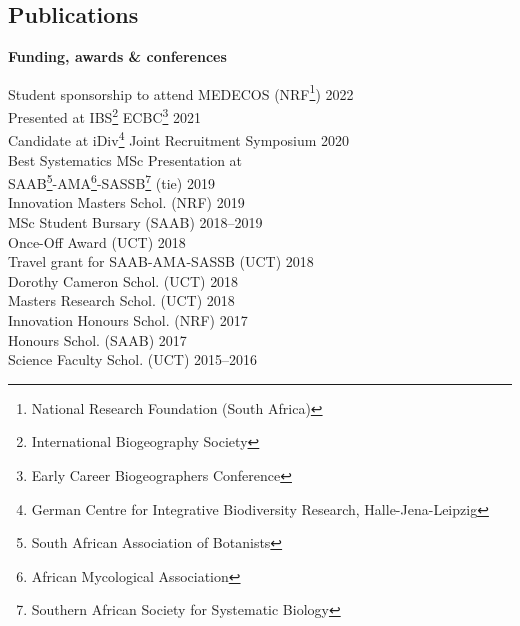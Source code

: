 \documentclass[10pt]{article}
\begin{document}


\bigskip



\subsection*{Publications} %



\hrulefill

\begin{multicols}{2}

\textbf{Funding, awards \& conferences} %

Student sponsorship to attend MEDECOS {\small
  (NRF\footnote{National Research Foundation
  (South Africa)})}                                \hfill {\small       2022} \\
Presented at IBS\footnote{International
  Biogeography Society} ECBC\footnote{Early Career
  Biogeographers Conference}                       \hfill {\small       2021} \\
Candidate at iDiv\footnote{German Centre for
  Integrative Biodiversity Research,
  Halle-Jena-Leipzig} Joint Recruitment Symposium  \hfill {\small       2020} \\
Best Systematics MSc Presentation at                                          \\
\hspace{2em} SAAB\footnote{South African
  Association of Botanists}-AMA\footnote{African
  Mycological Association}-SASSB\footnote{Southern
  African Society for Systematic Biology} (tie)    \hfill {\small       2019} \\
Innovation Masters Schol.          {\small  (NRF)} \hfill {\small       2019} \\
MSc Student Bursary                {\small (SAAB)} \hfill {\small 2018--2019} \\
Once-Off Award                     {\small  (UCT)} \hfill {\small       2018} \\
Travel grant for SAAB-AMA-SASSB    {\small  (UCT)} \hfill {\small       2018} \\
Dorothy Cameron Schol.             {\small  (UCT)} \hfill {\small       2018} \\
Masters Research Schol.            {\small  (UCT)} \hfill {\small       2018} \\
Innovation Honours Schol.          {\small  (NRF)} \hfill {\small       2017} \\
Honours Schol.                     {\small (SAAB)} \hfill {\small       2017} \\
Science Faculty Schol.             {\small  (UCT)} \hfill {\small 2015--2016}


\end{multicols}
\end{document}
